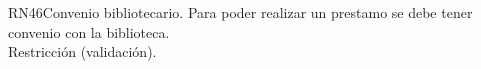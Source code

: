 \begin{BussinesRule}{RN46}{Convenio bibliotecario.} 
	\BRitem[Descripción:] Para poder realizar un prestamo se debe tener convenio con la biblioteca.\\
	\BRitem[Tipo:] Restricción (validación).
\end{BussinesRule}

